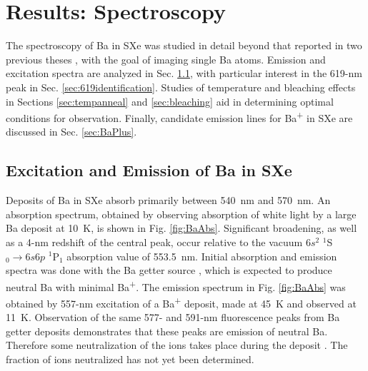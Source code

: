 \chapter{Results: Spectroscopy}
\label{chapter:spectroscopy}

The spectroscopy of Ba in SXe was studied in detail beyond that reported in two previous theses \cite{Shon,Brian}, with the goal of imaging single Ba atoms.  Emission and excitation spectra are analyzed in Sec. \ref{sec:fluorescence}, with particular interest in the 619-nm peak in Sec. \ref{sec:619identification}.  Studies of temperature and bleaching effects in Sections \ref{sec:tempanneal} and \ref{sec:bleaching} aid in determining optimal conditions for observation.  Finally, candidate emission lines for Ba\textsuperscript{+} in SXe are discussed in Sec. \ref{sec:BaPlus}.


\section{Excitation and Emission of Ba in SXe}
\label{sec:fluorescence}

Deposits of Ba in SXe absorb primarily between 540~nm and 570~nm.  An absorption spectrum, obtained by observing absorption of white light by a large Ba deposit at 10~K, is shown in Fig. \ref{fig:BaAbs}.  Significant broadening, as well as a 4-nm redshift  of the central peak, occur relative to the vacuum $6s^{2}$ $^{1}$S$_{0} \rightarrow 6s6p$ $^{1}$P$_{1}$ absorption value of 553.5~nm.  Initial absorption and emission spectra was done with the Ba getter source \cite{Mong2015,Shon,Brian}, which is expected to produce neutral Ba with minimal Ba\textsuperscript{+}.  The emission spectrum in Fig. \ref{fig:BaAbs} was obtained by 557-nm excitation of a Ba\textsuperscript{+} deposit, made at 45~K and observed at 11~K.  Observation of the same 577- and 591-nm fluorescence peaks from Ba getter deposits demonstrates that these peaks are emission of neutral Ba.  Therefore some neutralization of the ions takes place during the deposit \cite{Mong2015,Shon,Brian}.  The fraction of ions neutralized has not yet been determined.

